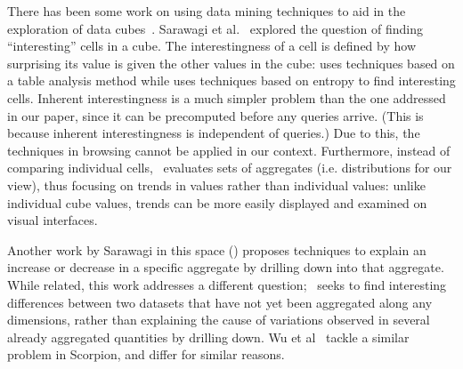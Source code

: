 There has been some  work on using data mining techniques
to aid in the exploration of data 
cubes~\cite{DBLP:conf/vldb/Sarawagi99, DBLP:conf/vldb/SatheS01, DBLP:conf/vldb/Sarawagi00, 
DBLP:conf/SIGKDD/OrdonezC09}.
Sarawagi et al.~\cite{DBLP:conf/EDBT/SarawagiAM98, DBLP:conf/vldb/Sarawagi00} 
 explored 
the question of finding ``interesting'' cells in a cube.
The interestingness of a cell is defined by how surprising
its value is given the other values in the cube:
\cite{DBLP:conf/EDBT/SarawagiAM98} uses techniques 
based on a table analysis method while
\cite{DBLP:conf/vldb/Sarawagi00} uses techniques based on entropy to find interesting cells.
Inherent interestingness is a much simpler problem than the
one addressed in our paper, since it can be precomputed before
any queries arrive. (This is because inherent interestingness is independent of queries.) 
Due to this, 
the techniques in browsing \cite{DBLP:conf/EDBT/SarawagiAM98, 
DBLP:conf/vldb/Sarawagi00} cannot be applied in our context.
Furthermore, instead of comparing individual cells, 
\SeeDB\ evaluates sets of aggregates (i.e. distributions
for our view), thus focusing on trends in values rather than individual values:
unlike individual cube values, trends can be more easily displayed
and examined on visual interfaces.

Another work by Sarawagi in this space (\cite{DBLP:conf/vldb/Sarawagi99}) 
proposes techniques to explain an
increase or decrease in a specific aggregate by drilling down into that aggregate.
While related, 
this work addresses a different question; \SeeDB\ seeks to find interesting
differences between two datasets that have not yet been aggregated along any dimensions,
 rather than explaining the cause of variations observed in several already aggregated
quantities by drilling down.  Wu et al~\cite{scorpion} tackle a similar problem in Scorpion,
and differ for similar reasons.




